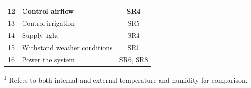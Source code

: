 \begin{table}[H]
\begin{tabular}{|c|p{8cm}|c|}
\hline
12 & Control airflow                                         & SR4 \\
\hline
13 & Control irrigation                                      & SR5 \\
\hline
14 & Supply light                                            & SR4 \\
\hline
15 & Withstand weather conditions                            & SR1 \\
\hline
16 & Power the system                                        & SR6, SR8 \\
\hline
\end{tabular}

\raggedright
\textsuperscript{1} Refers to both internal and external temperature and humidity for comparison.
\end{table}



\renewcommand{\arraystretch}{1.3}

